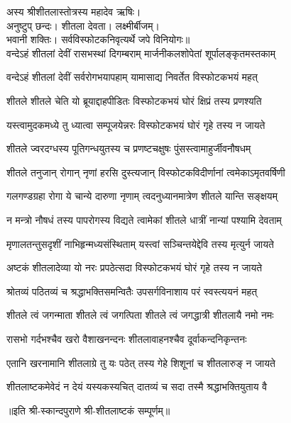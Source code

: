 
अस्य श्रीशीतलास्तोत्रस्य महादेव ऋषिः।\\
अनुष्टुप् छन्दः। शीतला देवता। लक्ष्मीर्बीजम्।\\
भवानी शक्तिः। सर्वविस्फोटकनिवृत्यर्थे जपे विनियोगः॥\\

\twolineshloka
{वन्देऽहं शीतलां देवीं रासभस्थां दिगम्बराम्}
{मार्जनीकलशोपेतां शूर्पालङ्कृतमस्तकाम्}

\twolineshloka
{वन्देऽहं शीतलां देवीं सर्वरोगभयापहाम्}
{यामासाद्य निवर्तेत विस्फोटकभयं महत्}

\twolineshloka
{शीतले शीतले चेति यो ब्रूयाद्दाहपीडितः}
{विस्फोटकभयं घोरं क्षिप्रं तस्य प्रणश्यति}

\twolineshloka
{यस्त्वामुदकमध्ये तु ध्यात्वा सम्पूजयेन्नरः}
{विस्फोटकभयं घोरं गृहे तस्य न जायते}

\twolineshloka
{शीतले ज्वरदग्धस्य पूतिगन्धयुतस्य च}
{प्रणष्टचक्षुषः पुंसस्त्वामाहुर्जीवनौषधम्}

\twolineshloka
{शीतले तनुजान् रोगान् नृणां हरसि दुस्त्यजान्}
{विस्फोटकविदीर्णानां त्वमेकाऽमृतवर्षिणी}

\twolineshloka
{गलगण्डग्रहा रोगा ये चान्ये दारुणा नृणाम्}
{त्वदनुध्यानमात्रेण शीतले यान्ति सङ्क्षयम्}

\twolineshloka
{न मन्त्रो नौषधं तस्य पापरोगस्य विद्यते}
{त्वामेकां शीतले धात्रीं नान्यां पश्यामि देवताम्}

\twolineshloka
{मृणालतन्तुसदृशीं नाभिहृन्मध्यसंस्थिताम्}
{यस्त्वां सञ्चिन्तयेद्देवि तस्य मृत्युर्न जायते}

\twolineshloka
{अष्टकं शीतलादेव्या यो नरः प्रपठेत्सदा}
{विस्फोटकभयं घोरं गृहे तस्य न जायते}

\twolineshloka
{श्रोतव्यं पठितव्यं च श्रद्धाभक्तिसमन्वितैः}
{उपसर्गविनाशाय परं स्वस्त्ययनं महत्}

\twolineshloka
{शीतले त्वं जगन्माता शीतले त्वं जगत्पिता}
{शीतले त्वं जगद्धात्री शीतलायै नमो नमः}

\twolineshloka
{रासभो गर्दभश्चैव खरो वैशाखनन्दनः}
{शीतलावाहनश्चैव दूर्वाकन्दनिकृन्तनः}

\twolineshloka
{एतानि खरनामानि शीतलाग्रे तु यः पठेत्}
{तस्य गेहे शिशूनां च शीतलारुङ् न जायते}

\twolineshloka
{शीतलाष्टकमेवेदं न देयं यस्यकस्यचित्}
{दातव्यं च सदा तस्मै श्रद्धाभक्तियुताय वै}

॥इति श्री-स्कान्दपुराणे श्री-शीतलाष्टकं सम्पूर्णम्॥